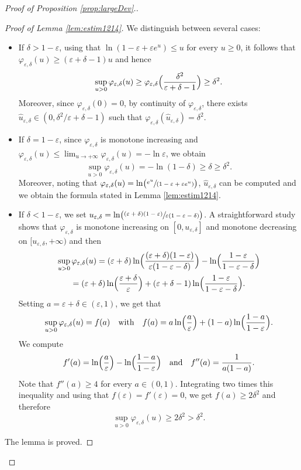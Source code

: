 \documentclass[10pt]{amsart}
\newcommand{\spfrac}[2]{\sfrac{#1}{(#2)}}
\theoremstyle{definition}
\begin{document}
\begin{proof}[Proof of Proposition \ref{prop:largeDev}.]
\begin{proof}[Proof of Lemma \ref{lem:estim1214}]
We distinguish between several cases:
\begin{itemize}
\item If $\delta>1-\varepsilon$, using that $\ln (1-\varepsilon+\varepsilon e^u)\leq u$ for every $u\geq 0$, it follows that $\varphi_{\varepsilon,\delta}(u)\geq (\varepsilon+\delta-1)u$ and hence
\[
\sup_{u >0}\varphi_{\varepsilon,\delta}(u)\geq \varphi_{\varepsilon,\delta}\Bigl(\frac{\delta^2}{\varepsilon+\delta-1}\Bigr)\geq \delta^2.
\]
Moreover, since $\varphi_{\varepsilon,\delta}(0)=0$, by continuity of $\varphi_{\varepsilon,\delta}$, there exists $\hat u_{\varepsilon,\delta}\in (0,\delta^2/\varepsilon+\delta-1)$ such that $\varphi_{\varepsilon,\delta}(\hat u_{\varepsilon,\delta})=\delta^2$.
\item If $\delta=1-\varepsilon$, since $\varphi_{\varepsilon,\delta}$ is monotone increasing and $\varphi_{\varepsilon,\delta}(u)\leq \lim_{u\rightarrow+\infty}\varphi_{\varepsilon,\delta}(u)=-\ln \varepsilon$, we obtain
\[
\sup_{u >0}\varphi_{\varepsilon,\delta}(u)=-\ln (1-\delta)\geq \delta\geq \delta^2.
\]
Moreover, noting that $\varphi_{\varepsilon,\delta}(u)=\ln \bigl(\spfrac{e^u}{1-\varepsilon+\varepsilon e^u}\bigr)$, $\hat u_{\varepsilon,\delta}$ can be computed and we obtain the formula stated in Lemma \ref{lem:estim1214}.
\item If $\delta <1-\varepsilon$, we set $u_{\varepsilon,\delta}=\ln \bigl(\sfrac{(\varepsilon+\delta)(1-\varepsilon)}{\varepsilon (1-\varepsilon-\delta)}\bigr)$. A straightforward study shows that $\varphi_{\varepsilon,\delta}$ is monotone increasing on $[0,u_{\varepsilon,\delta}]$ and monotone decreasing on $[u_{\varepsilon,\delta},+\infty)$ and then
\begin{multline*}
\sup_{u >0}\varphi_{\varepsilon,\delta}(u)=(\varepsilon+\delta)\ln \Bigl(\frac{(\varepsilon+\delta)(1-\varepsilon)}{\varepsilon (1-\varepsilon-\delta)}\Bigr)-\ln \Bigl(\frac{1-\varepsilon}{1-\varepsilon-\delta}\Bigr)\\
= (\varepsilon+\delta)\ln \Bigl(\frac{\varepsilon+\delta}{\varepsilon}\Bigr)+(\varepsilon+\delta-1)\ln \Bigl(\frac{1-\varepsilon}{1-\varepsilon-\delta}\Bigr).
\end{multline*}
Setting $a = \varepsilon + \delta\in (\varepsilon,1)$, we get that
\[
\sup_{u >0}\varphi_{\varepsilon,\delta}(u)= f(a)\quad \text{with}\quad f(a)=a \ln\Bigl(\frac{a}{\varepsilon}\Bigr) + (1-a) \ln\Bigl(\frac{1- a}{1-\varepsilon}\Bigr).
\]
We compute
\[
f'(a) = \ln\Bigl(\frac{a}{\varepsilon}\Bigr) - \ln\Bigl(\frac{1- a}{1-\varepsilon}\Bigr)\quad \text{and}\quad
f''(a) = \frac{1}{ a(1-a)}.
\]
Note that $f''(a)\geq 4$ for every $a\in (0,1)$. Integrating two times this inequality and using that $f(\varepsilon)=f'(\varepsilon)=0$, we get $f(a)\geq 2\delta^2$ and therefore
\[
\sup_{u >0}\varphi_{\varepsilon,\delta}(u)\geq 2\delta^2>\delta^2.
\]
\end{itemize}
The lemma is proved.
\end{proof}


\end{proof}
\end{document}
